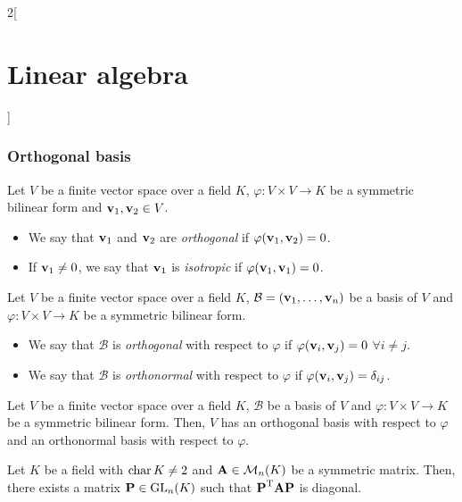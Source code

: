 \documentclass[../../../main_math.tex]{subfiles}
\begin{document}
\begin{multicols}{2}[\section{Linear algebra}]
  \subsubsection{Orthogonal basis}
  \begin{definition}\label{LA:isotrop}
    Let $V$ be a finite vector space over a field $K$, $\varphi:V\times V\rightarrow K$ be a symmetric bilinear form and $\boldsymbol{\mathrm{v}}_1,\boldsymbol{\mathrm{v}}_2\in V$.
    \begin{itemize}
      \item We say that $\boldsymbol{\mathrm{v}}_1$ and $\boldsymbol{\mathrm{v}}_2$ are \emph{orthogonal} if $\varphi(\boldsymbol{\mathrm{v}}_1,\boldsymbol{\mathrm{v}}_2)=0$.
      \item If $\boldsymbol{\mathrm{v}}_1\ne 0$, we say that $\boldsymbol{\mathrm{v}}_1$ is \emph{isotropic} if $\varphi(\boldsymbol{\mathrm{v}}_1,\boldsymbol{\mathrm{v}}_1)=0$.
    \end{itemize}
  \end{definition}
  \begin{definition}
    Let $V$ be a finite vector space over a field $K$, $\mathcal{B}=(\boldsymbol{\mathrm{v}}_1,\ldots,\boldsymbol{\mathrm{v}}_n)$ be a basis of $V$ and $\varphi:V\times V\rightarrow K$ be a symmetric bilinear form.
    \begin{itemize}
      \item We say that $\mathcal{B}$ is \emph{orthogonal} with respect to $\varphi$ if $\varphi(\boldsymbol{\mathrm{v}}_i,\boldsymbol{\mathrm{v}}_j)=0$ $\forall i\ne j$.
      \item We say that $\mathcal{B}$ is \emph{orthonormal} with respect to $\varphi$ if $\varphi(\boldsymbol{\mathrm{v}}_i,\boldsymbol{\mathrm{v}}_j)=\delta_{ij}$.
    \end{itemize}
  \end{definition}
  \begin{theorem}
    Let $V$ be a finite vector space over a field $K$, $\mathcal{B}$ be a basis of $V$ and $\varphi:V\times V\rightarrow K$ be a symmetric bilinear form. Then, $V$ has an orthogonal basis with respect to $\varphi$ and an orthonormal basis with respect to $\varphi$.
  \end{theorem}
  \begin{corollary}
    Let $K$ be a field with $\operatorname{char} K\ne 2$ and $\boldsymbol{\mathrm{A}}\in\mathcal{M}_n(K)$ be a symmetric matrix. Then, there exists a matrix $\boldsymbol{\mathrm{P}}\in\mathrm{GL}_n(K)$ such that ${\boldsymbol{\mathrm{P}}}^{\mathrm{T}}\boldsymbol{\mathrm{A}}\boldsymbol{\mathrm{P}}$ is diagonal.
  \end{corollary}

\end{multicols}
\end{document}
